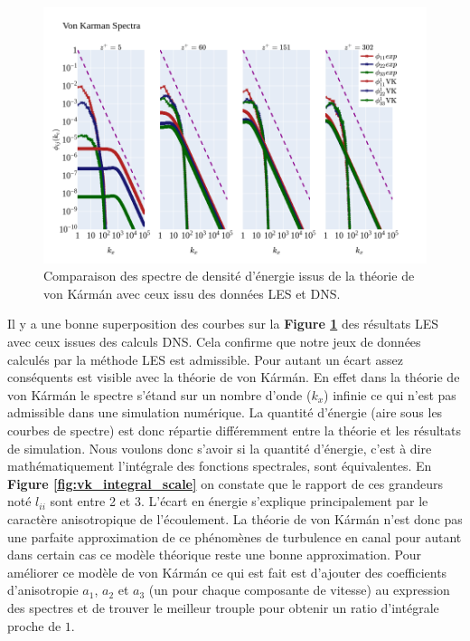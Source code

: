 \documentclass[12pt]{article}
\theoremstyle{plain}
\theoremstyle{remark}
\begin{document}
\begin{figure}[H]
	\begin{center}
		\includegraphics[width=0.9\linewidth]{../../output/figures/channel_wrles_retau395/split_time/von_karman/von_karman_spectra_.png}
		\caption{Comparaison des spectre de densité d'énergie issus de la théorie de von Kármán avec ceux issu des données LES et DNS.}
		\label{fig:vk_spectra}
	\end{center}
\end{figure}

Il y a une bonne superposition des courbes sur la \textbf{Figure \ref{fig:vk_spectra}} des résultats LES avec ceux issues des calculs DNS. Cela confirme que notre jeux de données calculés par la méthode LES est admissible. Pour autant un écart assez conséquents est visible avec la théorie de von Kármán. En effet dans la théorie de von Kármán le spectre s'étand sur un nombre d'onde ($k_x$) infinie ce qui n'est pas admissible dans une simulation numérique. La quantité d'énergie (aire sous les courbes de spectre) est donc répartie différemment entre la théorie et les résultats de simulation. Nous voulons donc s'avoir si la quantité d'énergie, c'est à dire mathématiquement l'intégrale des fonctions spectrales, sont équivalentes. En {\bf Figure \ref{fig:vk_integral_scale}} on constate que le rapport de ces grandeurs noté $l_{ii}$ sont entre 2 et 3. L'écart en énergie s'explique principalement par le caractère anisotropique de l'écoulement. La théorie de von Kármán n'est donc pas une parfaite approximation de ce phénomènes de turbulence en canal pour autant dans certain cas ce modèle théorique reste une bonne approximation. Pour améliorer ce modèle de von Kármán ce qui est fait est d'ajouter des coefficients d'anisotropie $a_1$, $a_2$ et $a_3$ (un pour chaque composante de vitesse) au expression des spectres et de trouver le meilleur trouple pour obtenir un ratio d'intégrale proche de $1$.
	
\end{document}
